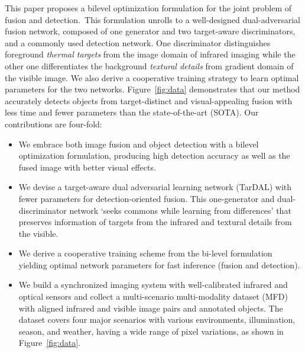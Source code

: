 \documentclass[10pt,twocolumn,letterpaper]{article}
\begin{document}
This paper proposes a bilevel optimization formulation for the joint problem of fusion and detection.~This formulation unrolls to a well-designed dual-adversarial fusion network, composed of one generator and two target-aware discriminators, and a commonly used detection network. One discriminator distinguishes foreground \emph{thermal targets} from the image domain of infrared imaging while the other one differentiates the background \emph{textural details} from gradient domain of the visible image. We also derive a cooperative training strategy to learn optimal parameters for the two networks. Figure~\ref{fig:data} demonstrates that our method accurately detects objects from target-distinct and visual-appealing fusion with less time and fewer parameters than the state-of-the-art (SOTA). Our contributions are four-fold:
\vspace{-0.6cm} 
\begin{itemize}
	\item We embrace both image fusion and object detection with a bilevel optimization formulation, producing high detection accuracy as well as the fused image with better visual effects. 
	\vspace{-0.3cm}
	\item We devise a target-aware dual adversarial learning network (TarDAL) with fewer parameters for detection-oriented fusion. This one-generator and dual-discriminator network `seeks commons while learning from differences' that preserves information of targets from the infrared and textural details from the visible.
	\vspace{-0.3cm}
	\item We derive a cooperative training scheme from the bi-level formulation yielding optimal network parameters for fast inference (fusion and detection).    
	\vspace{-0.3cm}
	\item We build a synchronized imaging system with well-calibrated infrared and optical sensors and collect a multi-scenario multi-modality dataset (MFD) with  aligned infrared and visible image pairs and  annotated objects. The dataset covers four major scenarios with various environments, illumination, season, and weather, having a wide range of pixel variations, as shown in Figure~\ref{fig:data}.
\end{itemize}
\end{document}
